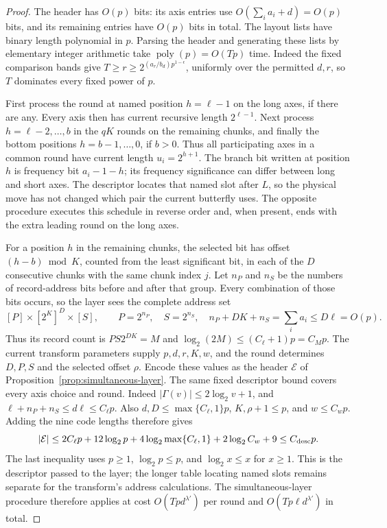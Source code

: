 \begin{proof}
The header has $O(p)$ bits: its axis entries use
$O(\sum_i a_i+d)=O(p)$ bits, and its remaining entries have
$O(p)$ bits in total. The layout lists have binary length polynomial
in $p$. Parsing the header and generating these lists by elementary
integer arithmetic take
$\operatorname{poly}(p)=O(Tp)$ time. Indeed the fixed comparison bands
give $T\geq r\geq2^{(a_r/b_d)p^{1-\epsilon}}$, uniformly over the
permitted $d,r$, so $T$ dominates every fixed power of $p$.

First process the round at named position $h=\ell-1$ on the long
axes, if there are any.  Every axis then has current recursive
length $2^{\ell-1}$.  Next process $h=\ell-2,\ldots,b$ in the $qK$
rounds on the remaining chunks, and finally the bottom positions
$h=b-1,\ldots,0$, if $b>0$.  Thus all participating axes in a
common round have current length $u_i=2^{h+1}$.
The branch bit written at position $h$ is frequency bit $a_i-1-h$;
its frequency significance can differ between long and short axes.
The descriptor locates that named slot after $L$, so the physical
move has not changed which pair the current butterfly uses.  The
opposite procedure executes this schedule in reverse order and,
when present, ends with the extra leading round on the long axes.

For a position $h$ in the remaining chunks, the selected bit has
offset $(h-b)\bmod K$, counted from the least significant bit, in
each of the $D$ consecutive chunks with the same chunk index $j$.
Let $n_P$ and $n_S$ be the numbers of record-address bits before and
after that group.  Every combination of those bits occurs, so the
layer sees the complete address set
\[
 [P]\times[2^K]^D\times[S],\qquad
 P=2^{n_P},\quad S=2^{n_S},\quad
 n_P+DK+n_S=\sum_i a_i\leq D\ell=O(p).
\]
Thus its record count is $PS2^{DK}=M$ and
$\log_2(2M)\leq(C_\ell+1)p=C_Mp$.
The current transform parameters supply $p,d,r,K,w$, and the round
determines $D,P,S$ and the selected offset $\rho$. Encode these values
as the header $\mathcal E$ of Proposition~\ref{prop:simultaneous-layer}.
The same fixed descriptor bound covers every axis choice and round.
Indeed $|\Gamma(v)|\leq2\log_2v+1$, and
$\ell+n_P+n_S\leq d\ell\leq C_\ell p$. Also
$d,D\leq\max\{C_\ell,1\}p$, $K,\rho+1\leq p$, and $w\leq C_wp$.
Adding the nine code lengths therefore gives
\[
 |\mathcal E|
 \leq 2C_\ell p+12\log_2p+
        4\log_2\max\{C_\ell,1\}+2\log_2C_w+9
 \leq C_{\rm desc}p.
\]
The last inequality uses $p\geq1$, $\log_2p\leq p$, and
$\log_2x\leq x$ for $x\geq1$.
This is the descriptor passed to the layer; the longer
table locating named slots remains separate for the transform's address
calculations.
The simultaneous-layer procedure therefore applies at cost
$O(Tpd^{\lambda'})$ per round and $O(Tp\ell d^{\lambda'})$ in total.


\end{proof}

